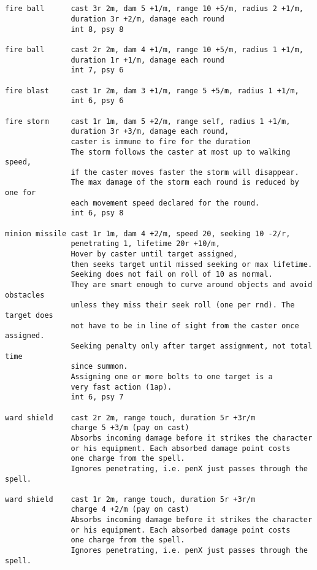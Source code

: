 \small \begin{verbatim}


fire ball      cast 3r 2m, dam 5 +1/m, range 10 +5/m, radius 2 +1/m,
               duration 3r +2/m, damage each round
               int 8, psy 8

fire ball      cast 2r 2m, dam 4 +1/m, range 10 +5/m, radius 1 +1/m,
               duration 1r +1/m, damage each round
               int 7, psy 6

fire blast     cast 1r 2m, dam 3 +1/m, range 5 +5/m, radius 1 +1/m,
               int 6, psy 6

fire storm     cast 1r 1m, dam 5 +2/m, range self, radius 1 +1/m,
               duration 3r +3/m, damage each round,
               caster is immune to fire for the duration
               The storm follows the caster at most up to walking speed,
               if the caster moves faster the storm will disappear.
               The max damage of the storm each round is reduced by one for
               each movement speed declared for the round.
               int 6, psy 8

minion missile cast 1r 1m, dam 4 +2/m, speed 20, seeking 10 -2/r,
               penetrating 1, lifetime 20r +10/m,
               Hover by caster until target assigned,
               then seeks target until missed seeking or max lifetime.
               Seeking does not fail on roll of 10 as normal.
               They are smart enough to curve around objects and avoid obstacles
               unless they miss their seek roll (one per rnd). The target does
               not have to be in line of sight from the caster once assigned.
               Seeking penalty only after target assignment, not total time
               since summon.
               Assigning one or more bolts to one target is a
               very fast action (1ap).
               int 6, psy 7

ward shield    cast 2r 2m, range touch, duration 5r +3r/m
               charge 5 +3/m (pay on cast)
               Absorbs incoming damage before it strikes the character
               or his equipment. Each absorbed damage point costs
               one charge from the spell.
               Ignores penetrating, i.e. penX just passes through the spell.

ward shield    cast 1r 2m, range touch, duration 5r +3r/m
               charge 4 +2/m (pay on cast)
               Absorbs incoming damage before it strikes the character
               or his equipment. Each absorbed damage point costs
               one charge from the spell.
               Ignores penetrating, i.e. penX just passes through the spell.


\end{verbatim}
